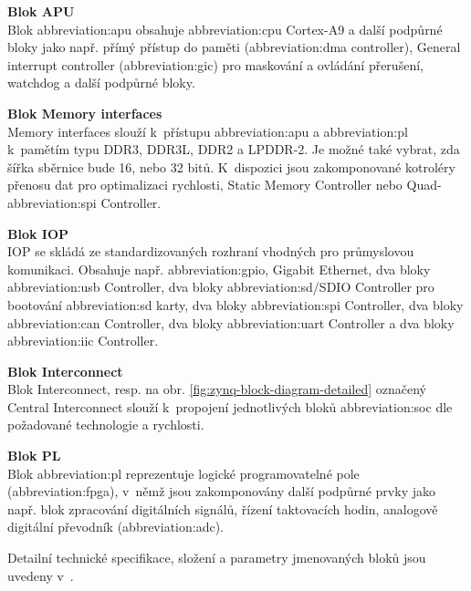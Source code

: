 \documentclass[a4paper, twoside, 11pt]{article}
\begin{document}
			\noindent\textbf{Blok APU}\\
			Blok \gls{abbreviation:apu} obsahuje \gls{abbreviation:cpu} Cortex-A9 a další podpůrné bloky jako např. přímý přístup do paměti (\gls{abbreviation:dma} controller), General interrupt controller (\gls{abbreviation:gic}) pro maskování a ovládání přerušení, watchdog a další podpůrné bloky.\par\vspace*{0.25cm}
			\noindent\textbf{Blok Memory interfaces}\\
			Memory interfaces slouží k~přístupu \gls{abbreviation:apu} a \gls{abbreviation:pl} k~pamětím typu DDR3, DDR3L, DDR2 a LPDDR-2. Je možné také vybrat, zda šířka sběrnice bude 16, nebo 32 bitů. K~dispozici jsou zakomponované kotroléry přenosu dat pro optimalizaci rychlosti, Static Memory Controller nebo Quad-\gls{abbreviation:spi} Controller.\par\vspace*{0.25cm}
			\noindent\textbf{Blok IOP}\\
			IOP se skládá ze standardizovaných rozhraní vhodných pro průmyslovou komunikaci. Obsahuje např. \gls{abbreviation:gpio}, Gigabit Ethernet, dva bloky \gls{abbreviation:usb} Controller, dva bloky \gls{abbreviation:sd}/SDIO Controller pro bootování \gls{abbreviation:sd} karty, dva bloky \gls{abbreviation:spi} Controller, dva bloky \gls{abbreviation:can} Controller, dva bloky \gls{abbreviation:uart} Controller a dva bloky \gls{abbreviation:iic} Controller.\par\vspace*{0.25cm}
			\noindent\textbf{Blok Interconnect}\\
			Blok Interconnect, resp. na obr. \ref{fig:zynq-block-diagram-detailed} označený Central Interconnect slouží k~propojení jednotlivých bloků \gls{abbreviation:soc} dle požadované technologie a rychlosti.\par\vspace*{0.25cm}
			\noindent\textbf{Blok PL}\\
			Blok \gls{abbreviation:pl} reprezentuje logické programovatelné pole (\gls{abbreviation:fpga}), v~němž jsou zakomponovány další podpůrné prvky jako např. blok zpracování digitálních signálů, řízení taktovacích hodin, analogově digitální převodník (\gls{abbreviation:adc}).\par\vspace*{0.35cm}
			\noindent Detailní technické specifikace, složení a parametry jmenovaných bloků jsou uvedeny v~\cite{xilinx-zynq-7000-technical-reference-manual}.
\end{document}
